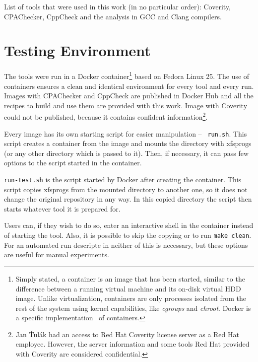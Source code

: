 List of tools that were used in this work (in no particular order): Coverity,
CPAChecker, CppCheck and the analysis in GCC and Clang compilers.


\section{Testing Environment}\label{chap:techniques:env}

The tools were run in a Docker container\footnote{Simply stated, a
	container is an image that has been started, similar to the
		difference between a running virtual machine and its
		on-disk virtual HDD image. Unlike virtualization,
		containers are only processes isolated from the rest of the
system using kernel capabilities, like {\em cgroups} and {\em chroot}.
Docker is a specific implementation~\cite{docker} of containers.} based on Fedora Linux
25. The use of containers ensures a clean and identical environment for
every tool and every run. Images with CPAChecker and CppCheck are published
in Docker Hub and all the recipes to build and use them are provided with
this work. Image with Coverity could not be published, because it contains
confident information\footnote{Jan Ťulák had an access to Red Hat Coverity license
server as a Red Hat employee. However, the server information and some tools
	Red Hat provided with Coverity are considered confidential.}.


Every image has its own starting script for easier manipulation -- {\tt
run.sh}.  This script creates a container from the image and mounts the
directory with xfsprogs (or any other directory which is passed to it).
Then, if necessary, it can pass few options to the script started in
the container.

{\tt run-test.sh} is the script started by Docker after creating the container.
This script copies xfsprogs from the mounted directory to another one, so it
does not change the original repository in any way. In this copied directory
the script then starts whatever tool it is prepared for.

Users can, if they wish to do so, enter an interactive shell in the container
instead of starting the tool. Also, it is possible to skip the copying or to
run {\tt make clean}. For an automated run descripte in
 neither of this is necessary, but these
options are useful for manual experiments.


